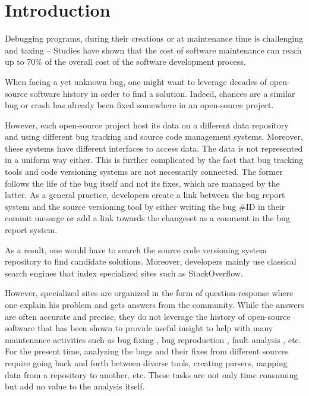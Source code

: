 \documentclass[conference]{IEEEtran}
\begin{document}
\IEEEpeerreviewmaketitle


\section{Introduction}

Debugging programs, during their creations or at maintenance time is challenging \cite{Pressman2005} and taxing -- Studies have shown that the cost of software maintenance can reach up to 70\% of the overall cost of the software development process.

 When facing a yet unknown bug, one might want to leverage decades of open-source software history in order to find a solution. Indeed, chances are a similar bug or crash has already been fixed somewhere in an open-source project.

 However, each open-source project host its data on a different data repository and using different bug tracking and source code management systems. Moreover,   these systems have different interfaces to access data.
 The data is not represented in a uniform way either.
 This is further complicated by the fact that bug tracking tools and code versioning systems are not necessarily connected.
 The former follows the life of the bug itself and not its fixes, which are managed by the latter.
 As a general practice, developers create a link between the bug report system and the source versioning tool by either writing the bug #ID in their commit message or add a link towards the changeset as a comment in the bug report system.

 As a result, one would have to search the source code versioning system repository to find candidate solutions.
 Moreover, developers mainly use classical search engines that index specialized sites such as StackOverflow.

 However, specialized sites are organized in the form of question-response where one explain his problem and gets answers from the community.
 While the answers are often accurate and precise, they do not leverage the history of open-source software that has been shown to provide useful insight to help with many maintenance activities such as bug fixing \cite{Weiß2007} \cite{Saha2014} , bug reproduction \cite{Chen2013a} \cite{Artzi2008} \cite{Jin2012}, fault analysis \cite{Nessa2008}, etc.
 For the present time, analyzing the bugs and their fixes from different sources require going back and forth between diverse tools, creating parsers, mapping data from a repository to another, etc.
 These tasks are not only time consuming but add no value to the analysis itself.
\end{document}
